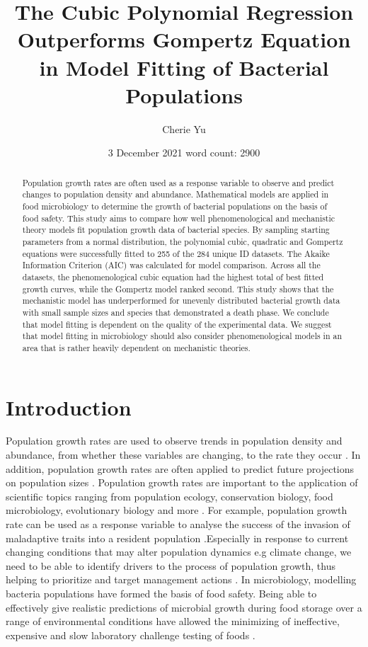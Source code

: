 \documentclass[11pt]{article}
\title{The Cubic Polynomial Regression Outperforms Gompertz Equation in Model Fitting of Bacterial Populations}
\author{Cherie Yu}
\affil{Imperial College London}
\date{3 December 2021\hspace*{3cm} word count: 2900}
\begin{document}
\maketitle

\pagebreak
\begin{abstract}
    Population growth rates are often used as a response variable to observe and predict changes to 
    population density and abundance. Mathematical models are applied in food microbiology to 
    determine the growth of bacterial populations on the basis of food safety. This study aims 
    to compare how well phenomenological and mechanistic theory models fit population growth data 
    of bacterial species. By sampling starting parameters from a normal distribution, the polynomial 
    cubic, quadratic and Gompertz equations were successfully fitted to 255 of the 284 unique ID datasets. 
    The Akaike Information Criterion (AIC) was calculated for model comparison. Across all the datasets, 
    the phenomenological cubic equation had the highest total of best fitted growth curves, while 
    the Gompertz model ranked second. This study shows that the mechanistic model has underperformed 
    for unevenly distributed bacterial growth data with small sample sizes and species that demonstrated 
    a death phase. We conclude that model fitting is dependent on the quality of the 
    experimental data. We suggest that model fitting in microbiology should also consider
    phenomenological models in an area that is rather heavily dependent on mechanistic theories. 
\end{abstract}

\section{Introduction}

\linenumbers
Population growth rates are used to observe trends in population density and abundance, from 
whether these variables are changing, to the rate they occur \cite{sibly_population_2002}. In addition, population 
growth rates are often applied to predict future projections on population sizes \cite{sibly_population_2002}. Population 
growth rates are important to the application of scientific topics ranging from population ecology, 
conservation biology, food microbiology, evolutionary biology and more \cite{sibly_population_2002,sibly_population_2002-1}. For example, 
population growth rate can be used as a response variable to analyse the success of the invasion 
of maladaptive traits into a resident population \cite{sibly_population_2002-1}.Especially in response to current changing 
conditions that may alter population dynamics e.g climate change, we need to be able to identify 
drivers to the process of population growth, thus helping to prioritize and target management actions \cite{eacker_assessing_2017}. 
In microbiology, modelling bacteria populations have formed the basis of food safety. Being able 
to effectively give realistic predictions of microbial growth during food storage over a range of 
environmental conditions have allowed the minimizing of ineffective, expensive and slow laboratory 
challenge testing of foods \cite{soboleva_predictive_2000,baranyi_mathematics_1995,perni_estimating_2005}. 
\end{document}

